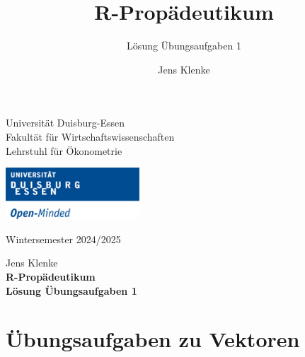 \documentclass[12pt,a4paper]{article}
\title{R-Propädeutikum}
\subtitle{Lösung Übungsaufgaben 1}
\author{Jens Klenke}
\date{}
\begin{document}





\restoregeometry



\begin{minipage}{0.6\textwidth}
Universität Duisburg-Essen\\
Fakultät für Wirtschaftswissenschaften\\
Lehrstuhl für Ökonometrie\\
\end{minipage}

	\begin{flushright}
	\vspace{-3cm}
	\includegraphics*[width=5cm]{includes/duelogo_en.png}\\
	\vspace{.125cm}
	\end{flushright}
\hspace{-0.005cm}Wintersemester 2024/2025

\vspace{0.05cm}

\begin{center}
	\vspace{.25cm}
	Jens Klenke \hspace{.5cm}  \\
	\vspace{.25cm}
	\textbf{\Large{R-Propädeutikum}}\\
	\vspace{.25cm}
	\textbf{\large{Lösung Übungsaufgaben 1}}\\
	\vspace{.125cm}
\end{center}





\section{Übungsaufgaben zu
Vektoren}\label{uxfcbungsaufgaben-zu-vektoren}
\end{document}

